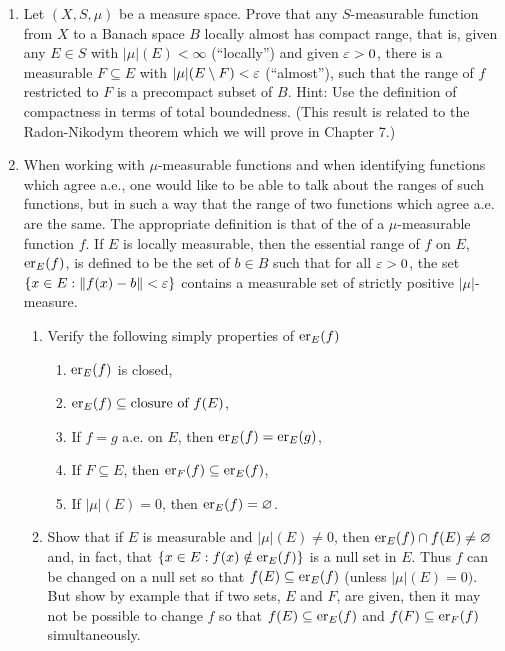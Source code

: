 \begin{enumerate}[label=\arabic*),ref=\arabic*]
\item Let $(X,S,\mu)$ be a measure space. Prove that any $S$-measurable function from $X$ to a Banach space $B$ locally almost has compact range, that is, given any $E\in S$ with $|\mu|(E)<\infty$ (``locally'') and given $\ep>0$, there is a measurable $F\subseteq E$ with $|\mu|(E\sd F)<\ep$ (``almost''), such that the range of $f$ restricted to $F$ is a precompact subset of $B$. Hint: Use the definition of compactness in terms of total boundedness. (This result is related to the Radon-Nikodym theorem which we will prove in Chapter 7.) %

\item \label{exer:essential range}
When working with $\mu$-measurable functions and when identifying functions which agree a.e., one would like to be able to talk about the ranges of such functions, but in such a way that the range of two functions which agree a.e. are the same. The appropriate definition is that of the  of a $\mu$-measurable function $f$. If $E$ is locally measurable, then the essential range of $f$ on $E$, $\er{f}{E}$, is defined to be the set of $b \in B$ such that for all $\ep>0$, the set $\brc{x\in E:\norm{f(x)-b}<\ep}$ contains a measurable set of strictly positive $|\mu|$-measure. %
\begin{enumerate}
    \item Verify the following simply properties of $\er{f}{E}$
    \begin{enumerate}[label=\arabic*)]
        \item $\er{f}{E}$ is closed,
        \item $\er{f}{E}\subseteq\text{closure of }f(E)$,
        \item If $f=g$ a.e. on $E$, then $\er{f}{E}=\er{g}{E}$,
        \item If $F\subseteq E$, then $\er{f}{F}\subseteq\er{f}{E}$,
        \item If $|\mu|(E)=0$, then $\er{f}{E}=\varnothing$.
    \end{enumerate}
    
    \item Show that if $E$ is measurable and $|\mu|(E)\neq 0$, then $\er{f}{E}\cap f(E)\neq\varnothing$ and, in fact, that $\brc{x \in E: f(x)\notin\er{f}{E}}$ is a null set in $E$. Thus $f$ can be changed on a null set so that $f(E) \subseteq\er{f}{E}$ (unless $|\mu|(E)=0)$. But show by example that if two sets, $E$ and $F$, are given, then it may not be possible to change $f$ so that $f(E)\subseteq\er{f}{E}$ and $f(F)\subseteq\er{f}{F}$ simultaneously.
    

\end{enumerate}
\end{enumerate}
